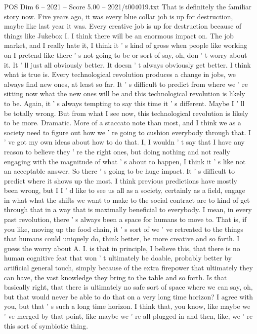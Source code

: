 \begin{textsample}{POS Dim 6 – 2021 – Score 5.00 – 2021/t004019.txt}
That is definitely the familiar story now.
Five years ago, it was every blue collar job is up for destruction, maybe like last year it was.
Every creative job is up for destruction because of things like Jukebox I.
I think there will be an enormous impact on.
The job market, and I really hate it, I think it ' s kind of gross when people like working on I pretend like there ' s not going to be or sort of say, oh, don ' t worry about it.
It ' ll just all obviously better.
It doesn ' t always obviously get better.
I think what is true is.
Every technological revolution produces a change in jobs, we always find new ones, at least so far.
It ' s difficult to predict from where we ' re sitting now what the new ones will be and this technological revolution is likely to be.
Again, it ' s always tempting to say this time it ' s different.
Maybe I ' ll be totally wrong.
But from what I see now, this technological revolution is likely to be more.
Dramatic.
More of a staccato note than most, and I think we as a society need to figure out how we ' re going to cushion everybody through that.
I ' ve got my own ideas about how to do that.
I, I wouldn ' t say that I have any reason to believe they ' re the right ones, but doing nothing and not really engaging with the magnitude of what ' s about to happen, I think it ' s like not an acceptable answer.
So there ' s going to be huge impact.
It ' s difficult to predict where it shows up the most.
I think previous predictions have mostly been wrong, but I I ' d like to see us all as a society, certainly as a field, engage in what what the shifts we want to make to the social contract are to kind of get through that in a way that is maximally beneficial to everybody.
I mean, in every past revolution, there ' s always been a space for humans to move to.
That is, if you like, moving up the food chain, it ' s sort of we ' ve retreated to the things that humans could uniquely do, think better, be more creative and so forth.
I guess the worry about A.
I. is that in principle, I believe this, that there is no human cognitive feat that won ' t ultimately be doable, probably better by artificial general touch, simply because of the extra firepower that ultimately they can have, the vast knowledge they bring to the table and so forth.
Is that basically right, that there is ultimately no safe sort of space where we can say, oh, but that would never be able to do that on a very long time horizon?
I agree with you, but that ' s such a long time horizon.
I think that, you know, like maybe we ' ve merged by that point, like maybe we ' re all plugged in and then, like, we ' re this sort of symbiotic thing.

\end{textsample}
